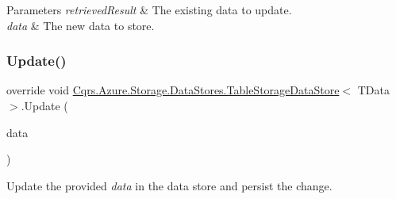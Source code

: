 \begin{DoxyParams}{Parameters}
{\em retrieved\+Result} & The existing data to update.\\
\hline
{\em data} & The new data to store.\\
\hline
\end{DoxyParams}
\mbox{\label{classCqrs_1_1Azure_1_1Storage_1_1DataStores_1_1TableStorageDataStore_a9afab2cca66ca4453b2ab56916578c7d_a9afab2cca66ca4453b2ab56916578c7d}} 
\subsubsection{\texorpdfstring{Update()}{Update()}}
{\footnotesize\ttfamily override void \hyperlink{classCqrs_1_1Azure_1_1Storage_1_1DataStores_1_1TableStorageDataStore}{Cqrs.\+Azure.\+Storage.\+Data\+Stores.\+Table\+Storage\+Data\+Store}$<$ T\+Data $>$.Update (\begin{DoxyParamCaption}\item[{T\+Data}]{data }\end{DoxyParamCaption})}



Update the provided {\itshape data}  in the data store and persist the change. 

